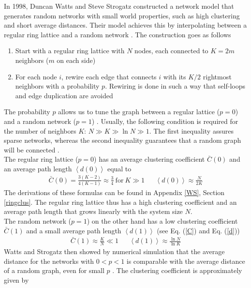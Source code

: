 \documentclass[11 pt , letterpaper , twoside , openright]{book}
\begin{document}
In 1998, Duncan Watts and Steve Strogatz constructed a network model that generates random networks with small world properties, such as high clustering and short average distances. Their model achieves this by interpolating between a regular ring lattice and a random network \cite{Watts1998}. The construction goes as follows \cite{Watts1998}
\begin{enumerate}
	\item Start with a regular ring lattice with $N$ nodes, each connected to $K = 2m$ neighbors ($m$ on each side)
	\item For each node $i$, rewire each edge that connects $i$ with its $K/2$ rightmost neighbors with a probability $p$. Rewiring is done in such a way that self-loops and edge duplication are avoided
\end{enumerate}
The probability $p$ allows us to tune the graph between a regular lattice ($p = 0$) and a random network ($p = 1$) \cite{Watts1998}. Usually, the following condition is required for the number of neighbors $K$: $N \gg K \gg \ln{N} \gg 1$. The first inequality assures sparse networks, whereas the second inequality guarantees that a random graph will be connected \cite{Watts1998}.\\
The regular ring lattice ($p=0$) has an average clustering coefficient $\bar{C}(0)$ and an average path length $\left<d(0)\right>$ equal to \cite{Watts1998}
\begin{align}\label{C0}
	\bar{C}(0) = \frac{3(K-2)}{4(K-1)} \approx \frac{3}{4} \ \text{for}\ K \gg 1 && \left<d(0)\right> \approx \frac{N}{2K}
\end{align}
The derivations of these formulas can be found in Appendix \ref{WS}, Section \ref{ringclus}. The regular ring lattice thus has a high clustering coefficient and an average path length that grows linearly with the system size $N$. \\
The random network ($p = 1$) on the other hand has a low clustering coefficient $\bar{C}(1)$ and a small average path length $\left<d(1)\right>$ (see Eq. (\ref{C}) and Eq. (\ref{d})) \cite{Watts1998}
\begin{align}
	\bar{C}(1) \approx \frac{K}{N} \ll 1 && \left<d(1)\right> \approx \frac{\ln{N}}{\ln{K}}
\end{align}
Watts and Strogatz then showed by numerical simulation that the average distance for the networks with $0 < p < 1$ is comparable with the average distance of a random graph, even for small $p$ \cite{Newman2000}. The clustering coefficient is approximately given by   \cite{Barrat1999}
\end{document}
